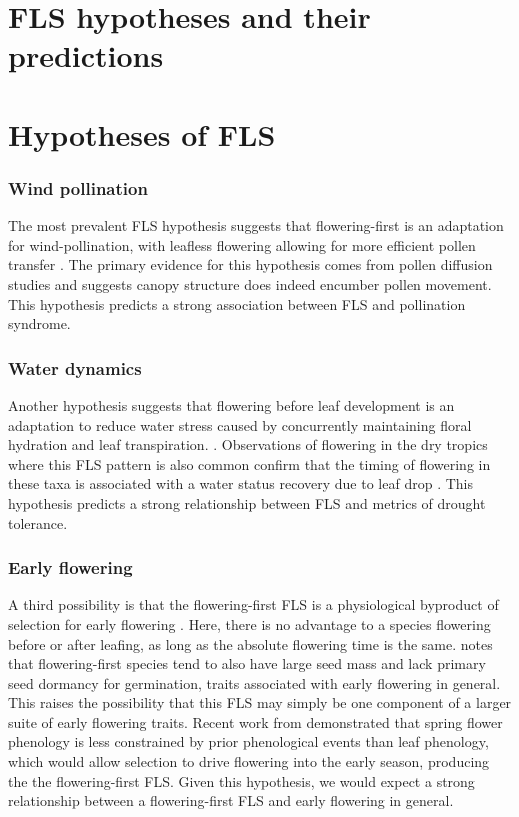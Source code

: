 \documentclass{article}
\begin{document}
\section*{FLS hypotheses and their predictions}
\section*{Hypotheses of FLS}
\subsubsection*{ Wind pollination}
\noindent The most prevalent FLS hypothesis suggests that flowering-first is an adaptation for wind-pollination, with leafless flowering allowing for more efficient pollen transfer \citep{Whitehead1969, Spurr1980,Friedman2009}. The primary evidence for this hypothesis comes from pollen diffusion studies \citep[e.g., particle movement through closed and open canopies,][]{Niklas1985,Nathan2005, Milleron2012} and suggests canopy structure does indeed encumber pollen movement. This hypothesis predicts a strong association between FLS and pollination syndrome.
\subsubsection*{Water dynamics}
\noindent Another hypothesis suggests that flowering before leaf development is an adaptation to reduce water stress caused by concurrently maintaining floral hydration and leaf transpiration. \citep{Franklin2016}. Observations of flowering in the dry tropics where this FLS pattern is also common confirm that the timing of flowering in these taxa is associated with a water status recovery due to leaf drop \citep{Borchert1983,Reich1984}. This hypothesis predicts a strong relationship between FLS and metrics of drought tolerance.
 

\subsubsection*{Early flowering}
\noindent A third possibility is that the flowering-first FLS is a physiological byproduct of selection for early flowering \citep{Primack1987}. Here, there is no advantage to a species flowering before or after leafing, as long as the absolute flowering time is the same. \citet{Primack1987} notes that flowering-first species tend to also have large seed mass and lack primary seed dormancy for germination, traits associated with early flowering in general. This raises the possibility that this FLS may simply be one component of a larger suite of early flowering traits. Recent work from \citet{Savage2019} demonstrated that spring flower phenology is less constrained by prior phenological events than leaf phenology, which would allow selection to drive flowering into the early season, producing the the flowering-first FLS. Given this hypothesis, we would expect a strong relationship between a flowering-first FLS and early flowering in general.
\end{document}
